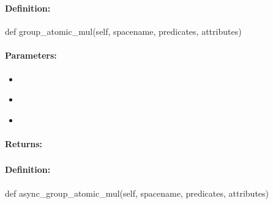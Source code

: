\pagebreak
\subsubsection{}
\label{api:python:group_atomic_mul}


\paragraph{Definition:}
\begin{pythoncode}
def group_atomic_mul(self, spacename, predicates, attributes)
\end{pythoncode}

\paragraph{Parameters:}
\begin{itemize}[noitemsep]
\item {}\\

\item {}\\

\item {}\\

\end{itemize}

\paragraph{Returns:}


\pagebreak
\subsubsection{}
\label{api:python:async_group_atomic_mul}


\paragraph{Definition:}
\begin{pythoncode}
def async_group_atomic_mul(self, spacename, predicates, attributes)
\end{pythoncode}

